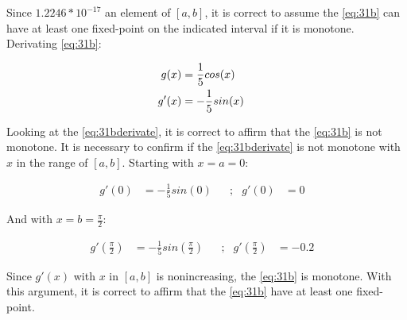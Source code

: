 	Since $1.2246 * 10^{-17}$ an element of $[a,b]$, it is correct to assume the \cref{eq:31b} can have at least one fixed-point on the indicated interval if it is monotone. Derivating \cref{eq:31b}:

	\begin{align}
		g(x) &= \frac{1}{5}cos(x)& \notag \\
		g'(x) &= -\frac{1}{5}sin(x)& 
		\label{eq:31bderivate}
	\end{align}

	Looking at the \cref{eq:31bderivate}, it is correct to affirm that the \cref{eq:31b} is not monotone. It is necessary to confirm if the \cref{eq:31bderivate} is not monotone with $x$ in the range of $[a,b]$. Starting with $x = a = 0$:

	\begin{align}
		g'(0) &= -\frac{1}{5}sin(0)& &;&
		g'(0) &= 0&
	\label{eq:31bderivatepix}
	\end{align}

	And with $x = b = \frac{\pi}{2}$:

	\begin{align}
		g'\left(\frac{\pi}{2}\right) &= -\frac{1}{5}sin\left(\frac{\pi}{2}\right)& &;&
		g'\left(\frac{\pi}{2}\right) &= -0.2&
	\label{eq:31bderivatepix}
	\end{align}

	Since $g'(x)$ with $x$ in $[a,b]$ is nonincreasing, the \cref{eq:31b} is monotone. With this argument, it is correct to affirm that the \cref{eq:31b} have at least one fixed-point.